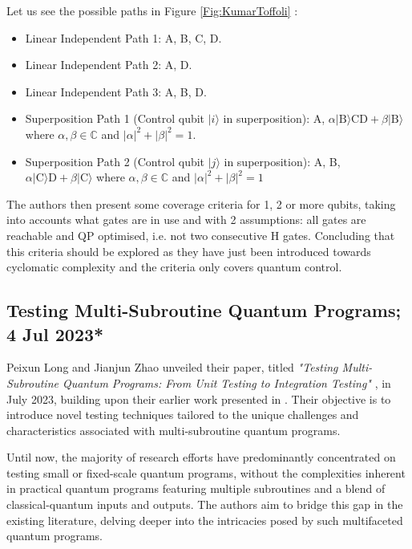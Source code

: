 \begin{itemize}
Let us see the possible paths in Figure \ref{Fig:KumarToffoli} :
\begin{itemize}
    \item Linear Independent Path 1: A, B, C, D.
    \item Linear Independent Path 2: A, D.
    \item Linear Independent Path 3: A, B, D.
    \item Superposition Path 1 (Control qubit $|i\rangle$ in superposition): A, $\alpha|\text{B}\rangle\text{CD}+\beta|\text{B}\rangle$ where $\alpha,\beta \in \mathbb{C}$ and $|\alpha|^{2}+|\beta|^{2}=1$.
    \item Superposition Path 2 (Control qubit $|j\rangle$ in superposition): A, B, $\alpha|\text{C}\rangle\text{D}+\beta|\text{C}\rangle$ where $\alpha,\beta \in \mathbb{C}$ and $|\alpha|^{2}+|\beta|^{2}=1$
\end{itemize}

The authors then present some coverage criteria for 1, 2 or more qubits, taking into accounts what gates are in use and with 2 assumptions: all gates are reachable and QP optimised, i.e. not two consecutive H gates. Concluding that this criteria should be explored as they have just been introduced towards cyclomatic complexity and the criteria only covers quantum control.

\vspace{15pt}
\subsection{Testing Multi-Subroutine Quantum Programs; 4 Jul 2023*}

Peixun Long and Jianjun Zhao unveiled their paper, titled \textit{"Testing Multi-Subroutine Quantum Programs: From Unit Testing to Integration Testing"} \cite{long2023testing}, in July 2023, building upon their earlier work presented in \cite{long2022testing}. Their objective is to introduce novel testing techniques tailored to the unique challenges and characteristics associated with multi-subroutine quantum programs.\newline

Until now, the majority of research efforts have predominantly concentrated on testing small or fixed-scale quantum programs, without the complexities inherent in practical quantum programs featuring multiple subroutines and a blend of classical-quantum inputs and outputs. The authors aim to bridge this gap in the existing literature, delving deeper into the intricacies posed by such multifaceted quantum programs.\newline


\end{itemize}
